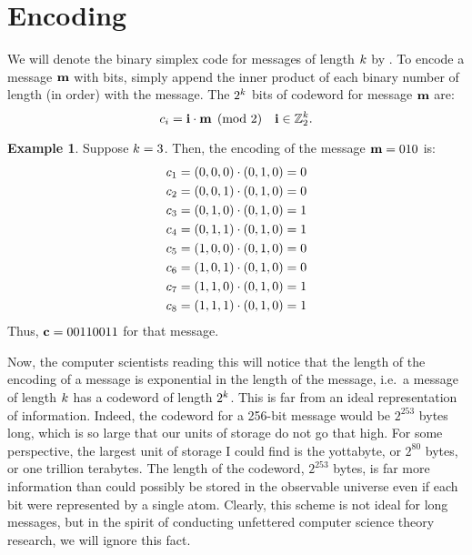 \documentclass[12pt,twoside]{reedthesis}
\theoremstyle{definition}
\newtheorem{example}[theorem]{Example}
\newcommand{\Z}{\mathbb{Z}}
\begin{document}
\section{Encoding}
We will denote the binary simplex code for messages of length $k$ by \simpl{\mlen}. To encode a message $\mathbf{m}$ with \mlen bits, simply append the inner product of each binary number of length \mlen (in order) with the message. The $2^k$ bits of codeword \cw for message $\mathbf{m}$ are: 
\begin{equation*}
\cwb{i}= \mathbf{i} \cdot \mess \pmod{2} \quad{\mathbf{i} \in \Z_2^\mlen}.
\end{equation*}
\begin{example}
Suppose $k=3$. Then, the encoding of the message $\mathbf{m} = 010$ is:
\begin{align*}
&c_{1} = (0,0,0) \cdot (0,1,0) = 0\\
&c_{2} = (0,0,1) \cdot (0,1,0) = 0\\
&c_{3} = (0,1,0) \cdot (0,1,0) = 1\\
&c_{4} = (0,1,1) \cdot (0,1,0) = 1\\
&c_{5} = (1,0,0) \cdot (0,1,0) = 0\\
&c_{6} = (1,0,1) \cdot (0,1,0) = 0\\
&c_{7} = (1,1,0) \cdot (0,1,0) = 1\\
&c_{8} = (1,1,1) \cdot (0,1,0) = 1\\
\end{align*}
Thus, $\mathbf{c} = 00110011$ for that message. 
\end{example}
Now, the computer scientists reading this will notice that the length of the encoding of a message is exponential in the length of the message, i.e.~a message of length $k$ has a codeword of length $2^k$. This is far from an ideal representation of information. Indeed, the codeword for a 256-bit message would be $2^{253}$ bytes long, which is so large that our units of storage do not go that high. For some perspective, the largest unit of storage I could find is the yottabyte, or $2^{80}$ bytes, or one trillion terabytes. The length of the codeword, $2^{253}$ bytes, is far more information than could possibly be stored in the observable universe even if each bit were represented by a single atom. Clearly, this scheme is not ideal for long messages, but in the spirit of conducting unfettered computer science theory research, we will ignore this fact. 
\end{document}
